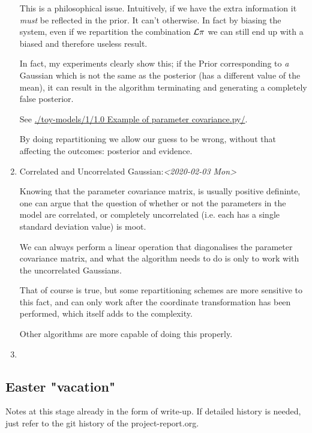 \documentclass[11pt]{article}
\begin{document}
\begin{enumerate}
This is a philosophical issue. Intuitively, if we have the
extra information it \emph{must} be reflected in the prior. It
can't otherwise. In fact by biasing the system, even if we
repartition the combination \({\cal L } \pi\) we can still
end up with a biased and therefore useless result.

In fact, my experiments clearly show this; if the Prior
corresponding to \emph{a} Gaussian which is not the same as the
posterior (has a different value of the mean), it can result
in the algorithm terminating and generating a completely
false posterior.

See \url{./toy-models/1/1.0 Example of parameter covariance.py/}. 

By doing repartitioning we allow our guess to be wrong,
without that affecting the outcomes: posterior and evidence.




\item Correlated and Uncorrelated Gaussian:\textit{<2020-02-03 Mon>}
\label{sec:org2704c91}


Knowing that the parameter covariance matrix, is usually
positive defininte, one can argue that the question of
whether or not the parameters in the model are correlated, or
completely uncorrelated (i.e. each has a single standard
deviation value) is moot.

We can always perform a linear operation that diagonalises
the parameter covariance matrix, and what the algorithm needs
to do is only to work with the uncorrelated Gaussians.

That of course is true, but some repartitioning schemes are
more sensitive to this fact, and can only work after the
coordinate transformation has been performed, which itself
adds to the complexity.


Other algorithms are more capable of doing this properly. 



\item 
\label{sec:org17aa4e6}
\end{enumerate}

\subsection{Easter "vacation"}
\label{sec:org1d719b0}

Notes at this stage already in the form of write-up. If detailed
history is needed, just refer to the git history of the
project-report.org.
\end{document}
